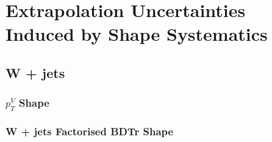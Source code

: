 \chapter{Extrapolation Uncertainties Induced by Shape Systematics}

\section{W + jets}
\subsection{$p_T^V$ Shape}

\subsection{W + jets Factorised BDTr Shape}


